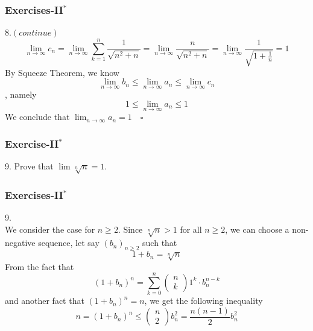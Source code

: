 \documentclass[12pt, t]{beamer}
\begin{document}
\begin{frame}
    \frametitle{Exercises-II$^*$}
    8.$(continue)$\\
    \begin{equation*}
        \lim_{n\rightarrow\infty}c_n=\lim_{n\rightarrow \infty}\sum^n_{k=1}\frac{1}{\sqrt{n^2+n}}=\lim_{n\rightarrow \infty}\frac{n}{\sqrt{n^2+n}}=\lim_{n\rightarrow\infty}\frac{1}{\sqrt{1+\frac{1}{n}}}=1
    \end{equation*}
    \hspace{1em} By Squeeze Theorem, we know
    \begin{equation*}
        \lim_{n\rightarrow\infty}b_n\leq \lim_{n\rightarrow\infty}a_n\leq \lim_{n\rightarrow\infty}c_n
    \end{equation*}
    , namely
    \begin{equation*}
        1\leq \lim_{n\rightarrow\infty}a_n\leq1
    \end{equation*}
    We conclude that $ \lim_{n\rightarrow\infty}a_n=1\quad\square$
\end{frame}


\begin{frame}
    \frametitle{Exercise-II$^*$}
    9. Prove that $\lim \sqrt[n]{n}=1$.
\end{frame}

\begin{frame}
    \frametitle{Exercises-II$^*$}
    9.\\
    \hspace{1em} We consider the case for $n\geq 2$. Since $\sqrt[n]{n}>1$ for all $n\geq 2$, we can choose a
    non-negative sequence, let say $(b_n)_{n\geq 2}$ such that
    \begin{equation*}
        1+b_n=\sqrt[n]{n}
    \end{equation*}
    \hspace{1em} From the fact that
    \begin{equation*}
        (1+b_n)^n=\sum^n_{k=0}\left(\begin{smallmatrix}n\\k\end{smallmatrix}\right)1^k\cdot b_n^{n-k}
    \end{equation*}
    and another fact that $(1+b_n)^n=n$, we get the following inequality
    \begin{equation*}
        n=(1+b_n)^n\leq \left(\begin{smallmatrix}n \\ 2\end{smallmatrix}\right) b^2_n=\frac{n(n-1)}{2}b^2_n
    \end{equation*}
\end{frame}
\end{document}
